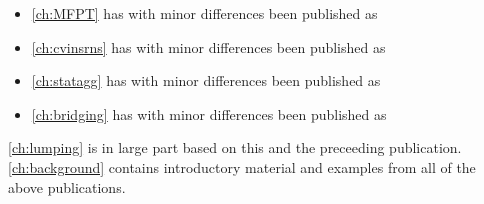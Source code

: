 \begin{itemize}

\item \autoref{ch:MFPT} has with minor differences been published as
\begin{quote}
\end{quote}

\item \autoref{ch:cvinsrns} has with minor differences been published as
\begin{quote}
\end{quote}

\item \autoref{ch:statagg} has with minor differences been published as
\begin{quote}
\end{quote}

\item \autoref{ch:bridging} has with minor differences been published as
\begin{quote}
\end{quote}
\end{itemize}
\autoref{ch:lumping} is in large part based on this and the preceeding publication.
\autoref{ch:background} contains introductory material and examples from all of the above publications.


% 


